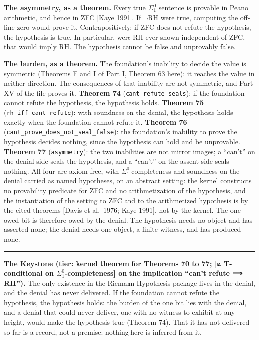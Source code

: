 \documentclass[10pt]{article}
\newcommand{\jboxstart}{\begin{jbox}}
\newenvironment{jbox}{\par\vspace{2pt}\noindent\color{accent}\rule{\columnwidth}{0.8pt}\par\vspace{-2pt}\small}{\par\vspace{2pt}}
\begin{document}
\textbf{The asymmetry, as a theorem.} Every true \(\Sigma^0_1\) sentence
is provable in Peano arithmetic, and hence in ZFC {[}Kaye 1991{]}. If
\(\neg\mathrm{RH}\) were true, computing the off-line zero would prove
it. Contrapositively: if ZFC does not refute the hypothesis, the
hypothesis is true. In particular, were RH ever shown independent of
ZFC, that would imply RH. The hypothesis cannot be false and unprovably
false.

\textbf{The burden, as a theorem.} The foundation's inability to decide
the value is symmetric (Theorems F and I of Part I, Theorem 63 here): it
reaches the value in neither direction. The consequences of that
inability are not symmetric, and Part XV of the file proves it.
\textbf{Theorem 74} (\texttt{cant\_refute\_seals}): if the foundation
cannot refute the hypothesis, the hypothesis holds. \textbf{Theorem 75}
(\texttt{rh\_iff\_cant\_refute}): with soundness on the denial, the
hypothesis holds exactly when the foundation cannot refute it.
\textbf{Theorem 76} (\texttt{cant\_prove\_does\_not\_seal\_false}): the
foundation's inability to prove the hypothesis decides nothing, since
the hypothesis can hold and be unprovable. \textbf{Theorem 77}
(\texttt{asymmetry}): the two inabilities are not mirror images; a
``can't'' on the denial side seals the hypothesis, and a ``can't'' on
the assent side seals nothing. All four are axiom-free, with
\(\Sigma^0_1\)-completeness and soundness on the denial carried as named
hypotheses, on an abstract setting: the kernel constructs no provability
predicate for ZFC and no arithmetization of the hypothesis, and the
instantiation of the setting to ZFC and to the arithmetized hypothesis
is by the cited theorems {[}Davis et al.~1976; Kaye 1991{]}, not by the
kernel. The one owed bit is therefore owed by the denial. The hypothesis
needs no object and has asserted none; the denial needs one object, a
finite witness, and has produced none.

\jboxstart

\textbf{The Keystone (tier: kernel theorem for Theorems 70 to 77; {[}⟀
T-conditional on \(\Sigma^0_1\)-completeness{]} on the implication
``can't refute ⟹ RH'').} The only existence in the Riemann Hypothesis
package lives in the denial, and the denial has never delivered. If the
foundation cannot refute the hypothesis, the hypothesis holds: the
burden of the one bit lies with the denial, and a denial that could
never deliver, one with no witness to exhibit at any height, would make
the hypothesis true (Theorem 74). That it has not delivered so far is a
record, not a premise: nothing here is inferred from it.
\end{document}
